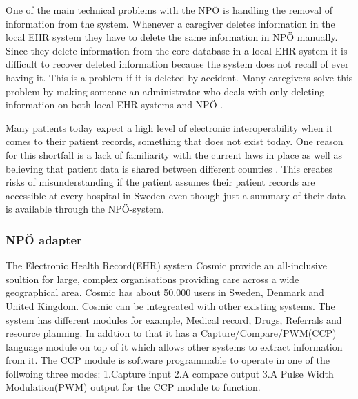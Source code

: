 \documentclass[14pt]{article}
\begin{document}
One of the main technical problems with the NPÖ is handling the removal of information from the system. Whenever a caregiver deletes information in the local EHR system they have to delete the same information in NPÖ manually. Since they delete information from the core database in a local EHR system it is difficult to recover deleted information because the system does not recall of ever having it. This is a problem if it is deleted by accident. Many caregivers solve this problem by making someone an administrator who deals with only deleting information on both local EHR systems and NPÖ  \cite{ViktorJernelov}.

Many patients today expect a high level of electronic interoperability when it comes to their patient records\cite{EPJ2}, something that does not exist today. One reason for this shortfall is a lack of familiarity with the current laws in place as well as believing that patient data is shared between different counties \cite{EPJ2}. This creates risks of misunderstanding if the patient assumes their patient records are accessible at every hospital in Sweden even though just a summary of their data is available through the NPÖ-system.
\label{sec:npoInterv}
\subsubsection{NPÖ adapter}
\label{sec:npoIntervi}

The Electronic Health Record(EHR) system Cosmic provide an all-inclusive soultion for large, complex organisations providing care across a wide geographical area. Cosmic has about 50.000 users in Sweden, Denmark and United Kingdom. Cosmic can be integreated with other existing systems. The system has different modules for example, Medical record, Drugs, Referrals and resource planning. In addtion to that it has a Capture/Compare/PWM(CCP) language module on top of it which allows other systems to extract information from it. The CCP module is software programmable to operate in one of the follwoing three modes: 1.Capture input 2.A compare output 3.A Pulse Width Modulation(PWM) output for the CCP module to function. 
\end{document}
